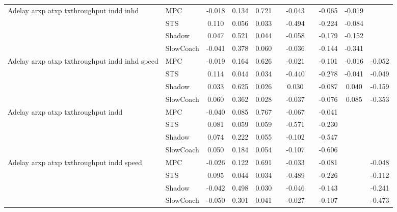 \begin{tabular}{|l|l|*{9}{c|}}
\midrule
Adelay arxp atxp txthroughput indd inhd    & MPC &   -0.018 &     0.134 &     0.721 &     & -0.043 &     &  -0.065 &  -0.019 &       \\
                              & STS &    0.110 &     0.056 &     0.033 &     & -0.494 &     &  -0.224 &  -0.084 &       \\
                              & Shadow &    0.047 &     0.521 &     0.044 &     & -0.058 &     &  -0.179 &  -0.152 &       \\
                              & SlowCoach &   -0.041 &     0.378 &     0.060 &     & -0.036 &     &  -0.144 &  -0.341 &       \\
\midrule
Adelay arxp atxp txthroughput indd inhd speed    & MPC &   -0.019 &     0.164 &     0.626 &     & -0.021 &     &  -0.101 &  -0.016 &   -0.052 \\
                              & STS &    0.114 &     0.044 &     0.034 &     & -0.440 &     &  -0.278 &  -0.041 &   -0.049 \\
                              & Shadow &    0.033 &     0.625 &     0.026 &     &  0.030 &     &  -0.087 &   0.040 &   -0.159 \\
                              & SlowCoach &    0.060 &     0.362 &     0.028 &     & -0.037 &     &  -0.076 &   0.085 &   -0.353 \\
\midrule
Adelay arxp atxp txthroughput indd    & MPC &   -0.040 &     0.085 &     0.767 &     & -0.067 &     &  -0.041 &      &       \\
                              & STS &    0.081 &     0.059 &     0.059 &     & -0.571 &     &  -0.230 &      &       \\
                              & Shadow &    0.074 &     0.222 &     0.055 &     & -0.102 &     &  -0.547 &      &       \\
                              & SlowCoach &    0.050 &     0.184 &     0.054 &     & -0.107 &     &  -0.606 &      &       \\
\midrule
Adelay arxp atxp txthroughput indd speed    & MPC &   -0.026 &     0.122 &     0.691 &     & -0.033 &     &  -0.081 &      &   -0.048 \\
                              & STS &    0.095 &     0.044 &     0.034 &     & -0.489 &     &  -0.226 &      &   -0.112 \\
                              & Shadow &   -0.042 &     0.498 &     0.030 &     & -0.046 &     &  -0.143 &      &   -0.241 \\
                              & SlowCoach &   -0.050 &     0.301 &     0.041 &     & -0.027 &     &  -0.107 &      &   -0.473 \\

\end{tabular}
